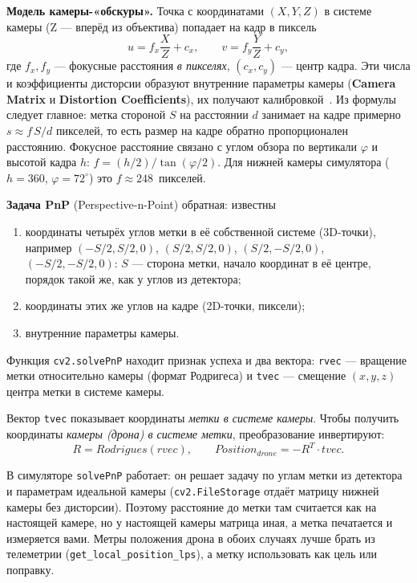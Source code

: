 \textbf{Модель камеры-«обскуры».} Точка с координатами $(X, Y, Z)$ в системе камеры (Z --- вперёд из объектива) попадает на кадр в пиксель
$$ u = f_x \frac{X}{Z} + c_x, \qquad v = f_y \frac{Y}{Z} + c_y, $$
где $f_x, f_y$ --- фокусные расстояния \emph{в пикселях}, $(c_x, c_y)$ --- центр кадра. Эти числа и коэффициенты дисторсии образуют внутренние параметры камеры (\textbf{Camera Matrix} и \textbf{Distortion Coefficients}), их получают калибровкой~\cite{zhang2000calibration}. Из формулы следует главное: метка стороной $S$ на расстоянии $d$ занимает на кадре примерно $s \approx f\,S/d$ пикселей, то есть размер на кадре обратно пропорционален расстоянию. Фокусное расстояние связано с углом обзора по вертикали $\varphi$ и высотой кадра $h$: $f = (h/2)/\tan(\varphi/2)$. Для нижней камеры симулятора ($h = 360$, $\varphi = 72^\circ$) это $f \approx 248$~пикселей.

\textbf{Задача PnP} (Perspective-n-Point) обратная: известны
\begin{enumerate}
    \item координаты четырёх углов метки в её собственной системе (3D-точки), например $(-S/2, S/2, 0)$, $(S/2, S/2, 0)$, $(S/2, -S/2, 0)$, $(-S/2, -S/2, 0)$: $S$ --- сторона метки, начало координат в её центре, порядок такой же, как у углов из детектора;
    \item координаты этих же углов на кадре (2D-точки, пиксели);
    \item внутренние параметры камеры.
\end{enumerate}
Функция \texttt{cv2.solvePnP} находит признак успеха и два вектора: \texttt{rvec} --- вращение метки относительно камеры (формат Родригеса) и \texttt{tvec} --- смещение $(x, y, z)$ центра метки в системе камеры.

\begin{alertbox}[Важно!]
Вектор \texttt{tvec} показывает координаты \textit{метки в системе камеры}. Чтобы получить координаты \textit{камеры (дрона) в системе метки}, преобразование инвертируют:
$$ R = Rodrigues(rvec), \qquad Position_{drone} = -R^T \cdot tvec. $$
\end{alertbox}

\begin{warnbox}
В симуляторе \verb|solvePnP| работает: он решает задачу по углам метки из детектора и параметрам идеальной камеры (\verb|cv2.FileStorage| отдаёт матрицу нижней камеры без дисторсии). Поэтому расстояние до метки там считается как на настоящей камере, но у настоящей камеры матрица иная, а метка печатается и измеряется вами. Метры положения дрона в обоих случаях лучше брать из телеметрии (\verb|get_local_position_lps|), а метку использовать как цель или поправку.
\end{warnbox}


